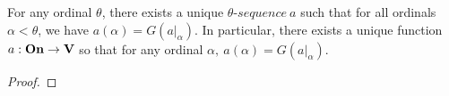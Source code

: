 \begin{theorem}
  For any ordinal $\theta$, there exists a unique $\theta \mbox{-} sequence \ a$ such that for all ordinals $\alpha < \theta$, we have $a(\alpha) = G(a|_{\alpha})$. In particular, there exists a unique function $a: \boldsymbol{\mathrm{On}} \to \boldsymbol{\mathrm{V}}$ so that for any ordinal $\alpha, \ a(\alpha) = G(a|_{\alpha})$.
\end{theorem}

\begin{proof}


\end{proof}
